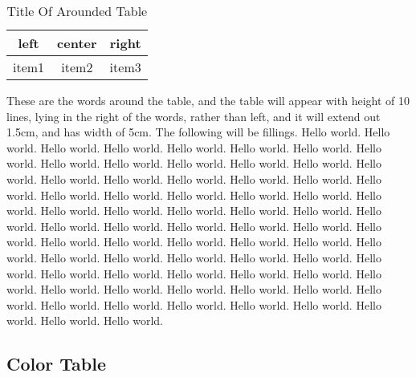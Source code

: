 \begin{wraptable}[10]{r}[1.5cm]{5cm}                    %
    \centering
    \caption{Title Of Arounded Table}
    \begin{tabular}{|c|c|c|}
        \hline
        left & center & right \\ \hline
        item1 & item2 & item3 \\ \hline
    \end{tabular}
\end{wraptable}
These are the words around the table, and the table will appear with height of 10 lines, 
lying in the right of the words, rather than left, and it will extend out 1.5cm, and has width of 5cm. 
The following will be fillings. 
Hello world. Hello world. Hello world. Hello world. Hello world. Hello world. Hello world. 
Hello world. Hello world. Hello world. Hello world. Hello world. Hello world. Hello world. 
Hello world. Hello world. Hello world. Hello world. Hello world. Hello world. Hello world. 
Hello world. Hello world. Hello world. Hello world. Hello world. Hello world. Hello world. 
Hello world. Hello world. Hello world. Hello world. Hello world. Hello world. Hello world. 
Hello world. Hello world. Hello world. Hello world. Hello world. Hello world. Hello world. 
Hello world. Hello world. Hello world. Hello world. Hello world. Hello world. Hello world. 
Hello world. Hello world. Hello world. Hello world. Hello world. Hello world. Hello world. 
Hello world. Hello world. Hello world. Hello world. Hello world. Hello world. Hello world. 
Hello world. Hello world. Hello world. Hello world. Hello world. Hello world. Hello world.

\subsection{Color Table}



